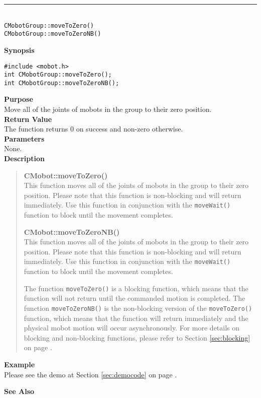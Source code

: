 \noindent
\vspace{5pt}
\rule{4.5in}{0.015in}\\
\noindent
{\LARGE \texttt{CMobotGroup::moveToZero()}}\\
{\LARGE \texttt{CMobotGroup::moveToZeroNB()}}\\
{}

\noindent
{\bf Synopsis}
\vspace{-8pt}
\begin{verbatim}
#include <mobot.h>
int CMobotGroup::moveToZero();
int CMobotGroup::moveToZeroNB();
\end{verbatim}

\noindent
{\bf Purpose}\\
Move all of the joints of mobots in the group to their zero position.\\

\noindent
{\bf Return Value}\\
The function returns 0 on success and non-zero otherwise.\\

\noindent
{\bf Parameters}\\
None.\\

\noindent
{\bf Description}\\
\vspace{-12pt}
\begin{quote}
{\bf CMobot::moveToZero()}\\
This function moves all of the joints of mobots in the group to their zero position.
Please note that this function is non-blocking and will return immediately. Use
this function in conjunction with the \texttt{moveWait()} function to block
until the movement completes.

{\bf CMobot::moveToZeroNB()}\\
This function moves all of the joints of mobots in the group to their zero position.
Please note that this function is non-blocking and will return immediately. Use
this function in conjunction with the \texttt{moveWait()} function to block
until the movement completes.

The function \texttt{moveToZero()} is a blocking function, which means that 
the function will not return until the commanded motion is 
completed. The function \texttt{moveToZeroNB()} is the non-blocking version of
the \texttt{moveToZero()} function, which means that the function will return
immediately and the physical mobot motion will occur asynchronously. For
more details on blocking and non-blocking functions, please refer to 
Section \ref{sec:blocking} on page \pageref{sec:blocking}.\\
\end{quote}

\noindent
{\bf Example}\\
Please see the demo at Section \ref{sec:democode} on page \pageref{sec:democode}.\\
\noindent

\noindent
{\bf See Also}\\


